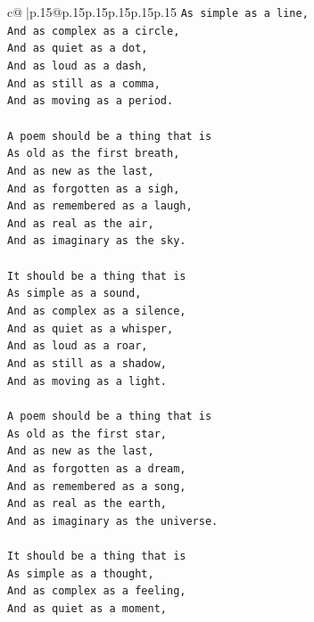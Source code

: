 \documentclass{article}
\begin{document}
{\begin{supertabular}{c@{$\;$}|p{.15\linewidth}@{}p{.15\linewidth}p{.15\linewidth}p{.15\linewidth}p{.15\linewidth}p{.15\linewidth}}
{{{\texttt{As simple as a line,} \\
\texttt{And as complex as a circle,} \\
\texttt{And as quiet as a dot,} \\
\texttt{And as loud as a dash,} \\
\texttt{And as still as a comma,} \\
\texttt{And as moving as a period.} \\
\\ 
\texttt{A poem should be a thing that is} \\
\texttt{As old as the first breath,} \\
\texttt{And as new as the last,} \\
\texttt{And as forgotten as a sigh,} \\
\texttt{And as remembered as a laugh,} \\
\texttt{And as real as the air,} \\
\texttt{And as imaginary as the sky.} \\
\\ 
\texttt{It should be a thing that is} \\
\texttt{As simple as a sound,} \\
\texttt{And as complex as a silence,} \\
\texttt{And as quiet as a whisper,} \\
\texttt{And as loud as a roar,} \\
\texttt{And as still as a shadow,} \\
\texttt{And as moving as a light.} \\
\\ 
\texttt{A poem should be a thing that is} \\
\texttt{As old as the first star,} \\
\texttt{And as new as the last,} \\
\texttt{And as forgotten as a dream,} \\
\texttt{And as remembered as a song,} \\
\texttt{And as real as the earth,} \\
\texttt{And as imaginary as the universe.} \\
\\ 
\texttt{It should be a thing that is} \\
\texttt{As simple as a thought,} \\
\texttt{And as complex as a feeling,} \\
\texttt{And as quiet as a moment,} \\
}}}
\end{supertabular}}
\end{document}
